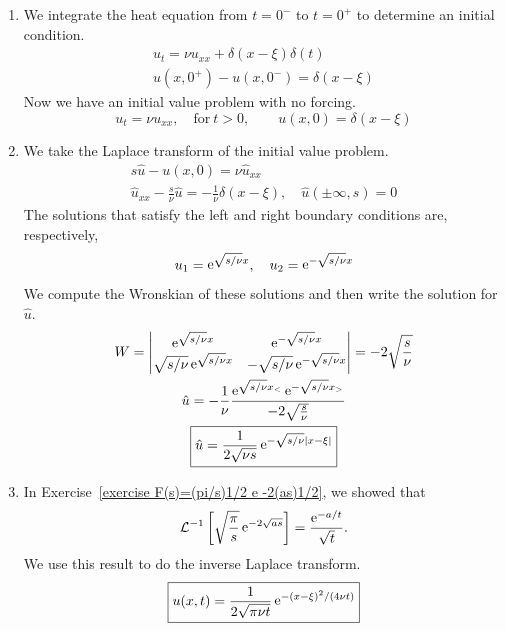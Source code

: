 {\begin{Solution}
  \begin{enumerate}
  \item 
    We integrate the heat equation from $t = 0^-$ to $t = 0^+$ to determine 
    an initial condition.
    \begin{gather*}
      u_t = \nu u_{x x} + \delta(x - \xi) \delta(t)
      \\
      u(x,0^+) - u(x,0^-) = \delta(x - \xi)
    \end{gather*}
    Now we have an initial value problem with no forcing.
    \[
    \boxed{
      u_t = \nu u_{x x}, \quad \mathrm{for}\ t > 0, \qquad u(x,0) = \delta(x - \xi)
      }
    \]
  \item 
    We take the Laplace transform of the initial value problem.
    \begin{gather*}
      s \hat{u} - u(x,0) = \nu \hat{u}_{x x}
      \\
      \hat{u}_{x x} - \frac{s}{\nu} \hat{u} = - \frac{1}{\nu} \delta(x - \xi), \quad
      \hat{u}(\pm \infty,s) = 0
    \end{gather*}
    The solutions that satisfy the left and right boundary conditions are, 
    respectively,
    \[
    u_1 = \mathop{\mathrm{e}}\nolimits^{\sqrt{s/\nu} x}, \quad
    u_2 = \mathop{\mathrm{e}}\nolimits^{-\sqrt{s/\nu} x}
    \]
    We compute the Wronskian of these solutions and then write the solution for
    $\hat{u}$.
    \begin{gather*}
      W = \begin{vmatrix}
        \mathop{\mathrm{e}}\nolimits^{\sqrt{s/\nu} x} & \mathop{\mathrm{e}}\nolimits^{-\sqrt{s/\nu} x} \\
        \sqrt{s/\nu} \mathop{\mathrm{e}}\nolimits^{\sqrt{s/\nu} x} & - \sqrt{s/\nu} \mathop{\mathrm{e}}\nolimits^{-\sqrt{s/\nu} x}
      \end{vmatrix}
      = - 2 \sqrt{ \frac{s}{\nu} }
      \\
      \hat{u} = - \frac{1}{\nu} \frac{ \mathop{\mathrm{e}}\nolimits^{\sqrt{s/\nu} x_<} \mathop{\mathrm{e}}\nolimits^{-\sqrt{s/\nu} x_> } }
      { - 2 \sqrt{ \frac{s}{\nu} } }
      \\
      \boxed{
        \hat{u} = \frac{1}{2 \sqrt{\nu s}} \mathop{\mathrm{e}}\nolimits^{- \sqrt{s/\nu} |x - \xi|}
        }
    \end{gather*}
  \item 
    In Exercise~\ref{exercise F(s)=(pi/s)1/2 e -2(as)1/2}, we showed that
    \[
    \mathcal{L}^{-1} \left[ \sqrt{\frac{\pi}{s}} \mathop{\mathrm{e}}\nolimits^{-2 \sqrt{a s}} \right]
    = \frac{\mathop{\mathrm{e}}\nolimits^{-a / t}}{\sqrt{t}}.
    \]
    We use this result to do the inverse Laplace transform.
    \[
    \boxed{
      u(x,t) = \frac{1}{2 \sqrt{\pi \nu t}} \mathop{\mathrm{e}}\nolimits^{- (x - \xi)^2 / (4 \nu t)}
      }
    \]
  \end{enumerate}
\end{Solution}












}
